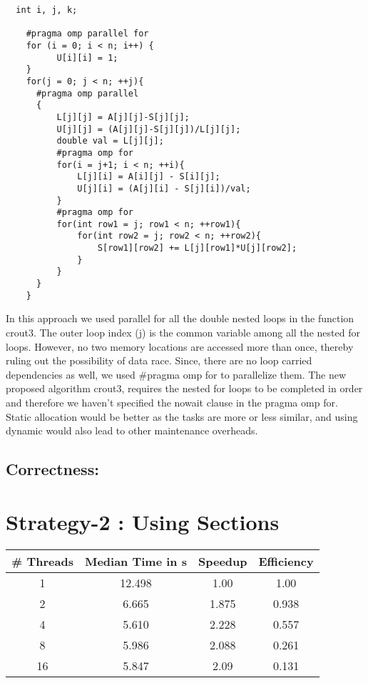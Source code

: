 \documentclass[12pt]{article}
\begin{document}
\begin{verbatim}
  int i, j, k;

	#pragma omp parallel for
	for (i = 0; i < n; i++) {
		  U[i][i] = 1;
	}
	for(j = 0; j < n; ++j){
      #pragma omp parallel
      {	
          L[j][j] = A[j][j]-S[j][j];
          U[j][j] = (A[j][j]-S[j][j])/L[j][j];
          double val = L[j][j];
          #pragma omp for
          for(i = j+1; i < n; ++i){
              L[j][i] = A[i][j] - S[i][j];
              U[j][i] = (A[j][i] - S[j][i])/val;
          }
          #pragma omp for
          for(int row1 = j; row1 < n; ++row1){
              for(int row2 = j; row2 < n; ++row2){
                  S[row1][row2] += L[j][row1]*U[j][row2];
              }
          }
      }
	}

\end{verbatim}

  In this approach we used parallel for all the double nested loops in 
  the function crout3. The outer loop index (j) is the common variable among all 
  the nested for loops. However, no two memory locations are accessed more than once,
  thereby ruling out the possibility of data race. Since, there are no loop carried
  dependencies as well, we used \#pragma omp for to parallelize them. The new proposed
  algorithm crout3, requires the nested for loops to be completed in order and therefore
  we haven't specified the nowait clause in the pragma omp for. Static allocation would be
  better as the tasks are more or less similar, and using dynamic would also lead to other
  maintenance overheads.

\subsection*{Correctness:}

\section*{Strategy-2 : Using Sections}

\begin{table}[H]
    \begin{center}
      \begin{tabular}{|c|c|c|c|} %
      \hline
      \textbf{\# Threads} & \textbf{Median Time in s} & \textbf{Speedup} & \textbf{Efficiency}\\
        \hline
        1 & 12.498 & 1.00 & 1.00\\  
        2 & 6.665 & 1.875 & 0.938\\
        4 & 5.610 & 2.228 & 0.557\\
        8 & 5.986 & 2.088 & 0.261\\
        16 & 5.847 & 2.09 & 0.131\\
        \hline
      \end{tabular}
    \end{center}
  \end{table}
\end{document}
